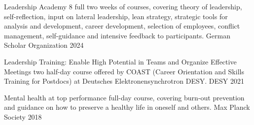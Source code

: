 \begin{cvhonors}

    \cvhonor
      {Leadership Academy 8} %
      {full two weeks of courses, covering theory of leadership, self-reflection, input on lateral leadership, lean strategy, strategic tools for analysis and development, career development, selection of employees, conflict management, self-guidance and intensive feedback to participants.} %
      {German Scholar Organization} %
      {2024} %

    \cvhonor
      {Leadership Training: Enable High Potential in Teams and Organize Effective Meetings} %
      {two half-day course offered by COAST (Career Orientation and
      Skills Training for Postdocs) at Deutsches Elektronensynchrotron DESY.} %
      {DESY} %
      {2021} %

    \cvhonor
      {Mental health at top performance} %
      {full-day course, covering burn-out prevention and guidance on how to preserve a healthy life in oneself and others.} %
      {Max Planck Society} %
      {2018} %

\end{cvhonors}
